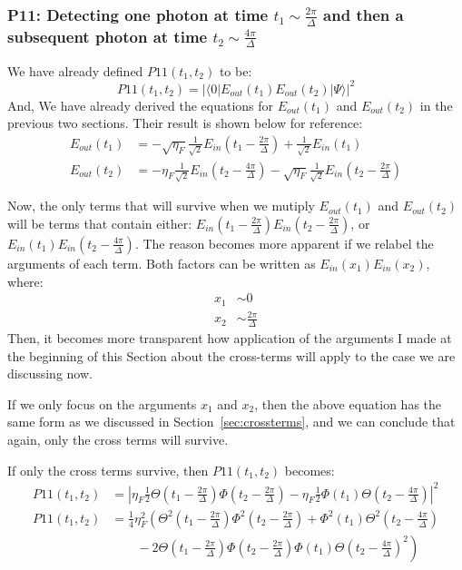 \documentclass[12pt]{article}
\begin{document}
\subsubsection{P11: Detecting one photon at time $t_1 \sim \frac{2 \pi}{\Delta}$ and then a subsequent photon at time $t_2 \sim \frac{4 \pi}{\Delta}$}
We have already defined $P11(t_1,t_2)$ to be:
\begin{equation}
P11(t_1,t_2) = | \langle 0 | E_{out}(t_1) E_{out}(t_2) |\Psi\rangle|^2
\end{equation}
And, We have already derived the equations for $E_{out}(t_1)$ and $E_{out}(t_2)$ in the previous two sections. Their result is shown below for reference:
\begin{align}
E_{out}(t_1) &= -\sqrt{\eta_F}\frac{1}{\sqrt{2}}E_{in}(t_1-\frac{2 \pi}{\Delta}) +\frac{1}{\sqrt{2}}E_{in}(t_1)\\
E_{out}(t_2) &= -\eta_F\frac{1}{\sqrt{2}}E_{in}(t_2-\frac{4\pi}{\Delta})-\sqrt{\eta_F}\frac{1}{\sqrt{2}}E_{in}(t_2-\frac{2\pi}{\Delta})
\end{align}

Now, the only terms that will survive when we mutiply $E_{out}(t_1)$ and $E_{out}(t_2)$ will be terms that contain either: $E_{in}(t_1-\frac{2 \pi}{\Delta})E_{in}(t_2-\frac{2 \pi}{\Delta})$, or $E_{in}(t_1)E_{in}(t_2-\frac{4 \pi}{\Delta})$. The reason becomes more apparent if we relabel the arguments of each term.
Both factors can be written as $E_{in}(x_1)E_{in}(x_2)$, where:
\begin{align}
x_1 & \sim 0 \\
x_2 & \sim \frac{2 \pi}{\Delta}
\end{align}
Then, it becomes more transparent how application of the arguments I made at the beginning of this Section about the cross-terms will apply to the case we are discussing now.

If we only focus on the arguments $x_1$ and $x_2$, then the above equation has the same form as we discussed in Section~\ref{sec:crossterms}, and we can conclude that again, only the cross terms will survive.

If only the cross terms survive, then $P11(t_1,t_2)$ becomes:
\begin{align}
P11(t_1,t_2) & =\left|  \eta_F\frac{1}{2}\Theta(t_1-\frac{2 \pi}{\Delta})\Phi(t_2-\frac{2 \pi}{\Delta})-\eta_F\frac{1}{2}\Phi(t_1)\Theta(t_2-\frac{4 \pi}{\Delta})\right|^2\\
P11(t_1,t_2) & =  \frac{1}{4}\eta_F^2 \left( \Theta^2(t_1-\frac{2 \pi}{\Delta})\Phi^2(t_2-\frac{2 \pi}{\Delta})+\Phi^2(t_1)\Theta^2(t_2-\frac{4 \pi}{\Delta})\right. \\
&\left. \qquad -2\Theta(t_1-\frac{2 \pi}{\Delta})\Phi(t_2-\frac{2 \pi}{\Delta})\Phi(t_1)\Theta(t_2-\frac{4 \pi}{\Delta})^2\right)\\
\end{align}
\end{document}
